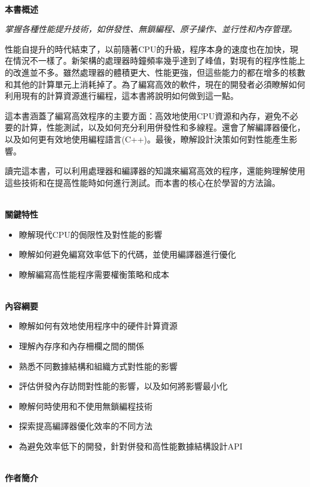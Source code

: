 \documentclass[11pt,a4paper,UTF8]{book}
\begin{document}
\hspace*{\fill} \\ %
\noindent\textbf{本書概述}

\textit{掌握各種性能提升技術，如併發性、無鎖編程、原子操作、並行性和內存管理。}

性能自提升的時代結束了，以前隨著CPU的升級，程序本身的速度也在加快，現在情況不一樣了。新架構的處理器時鐘頻率幾乎達到了峰值，對現有的程序性能上的改進並不多。雖然處理器的體積更大、性能更強，但這些能力的都在增多的核數和其他的計算單元上消耗掉了。為了編寫高效的軟件，現在的開發者必須瞭解如何利用現有的計算資源進行編程，這本書將說明如何做到這一點。

這本書涵蓋了編寫高效程序的主要方面：高效地使用CPU資源和內存，避免不必要的計算，性能測試，以及如何充分利用併發性和多線程。還會了解編譯器優化，以及如何更有效地使用編程語言(C++)。最後，瞭解設計決策如何對性能產生影響。

讀完這本書，可以利用處理器和編譯器的知識來編寫高效的程序，還能夠理解使用這些技術和在提高性能時如何進行測試。而本書的核心在於學習的方法論。

\hspace*{\fill} \\ %
\noindent\textbf{關鍵特性}
\begin{itemize}
\item 瞭解現代CPU的侷限性及對性能的影響
\item 瞭解如何避免編寫效率低下的代碼，並使用編譯器進行優化
\item 瞭解編寫高性能程序需要權衡策略和成本
\end{itemize}

\hspace*{\fill} \\ %
\noindent\textbf{內容綱要}
\begin{itemize}
\item 瞭解如何有效地使用程序中的硬件計算資源
\item 理解內存序和內存柵欄之間的關係
\item 熟悉不同數據結構和組織方式對性能的影響
\item 評估併發內存訪問對性能的影響，以及如何將影響最小化
\item 瞭解何時使用和不使用無鎖編程技術
\item 探索提高編譯器優化效率的不同方法
\item 為避免效率低下的開發，針對併發和高性能數據結構設計API
\end{itemize}

\hspace*{\fill} \\ %
\noindent\textbf{作者簡介}
\end{document}
